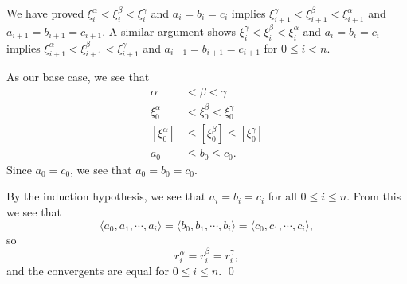\documentclass[12 pt]{amsart}
\begin{document}
  We  have proved 
  $\xi^{\alpha}_i < \xi^{\beta}_i < \xi^{\gamma}_i$
  and $a_i = b_i = c_i$ implies
  $\xi^{\gamma}_{i+1} < \xi^{\beta}_{i+1} < \xi^{\alpha}_{i+1}$
  and $a_{i+1} = b_{i+1} =  c_{i+1}$.
  A similar argument shows 
  $\xi^{\gamma}_i < \xi^{\beta}_i < \xi^{\alpha}_i$
  and $a_i = b_i = c_i$ implies
  $\xi^{\alpha}_{i+1} < \xi^{\beta}_{i+1} < \xi^{\gamma}_{i+1}$
  and $a_{i+1} = b_{i+1} =  c_{i+1}$
  for $0 \leq i < n$.

  As our base case, we see that 
  \begin{align*}
    \alpha &< \beta < \gamma \\
    \xi_0^{\alpha} &< \xi_0^{\beta} < \xi_0^{\gamma} \\
    [\xi_0^{\alpha}] &\leq [\xi_0^{\beta}] \leq [\xi_0^{\gamma}] \\
    a_0 &\leq b_0 \leq c_0.
  \end{align*}
  Since $a_0 = c_0$, we see that $a_0 = b_0 = c_0$.

  By the induction hypothesis, we see that 
  $a_i = b_i = c_i$ for all $0 \leq i \leq n$.
  From this we see that
  \[
    \langle a_0, a_1, \cdots, a_i \rangle
    = 
    \langle b_0, b_1, \cdots, b_i \rangle
    = 
    \langle c_0, c_1, \cdots, c_i \rangle,
  \]
  so 
  \[
    r_i^{\alpha} = r_i^{\beta} = r_i^{\gamma},
  \]
  and the convergents are equal for $0 \leq i \leq n$.
  \qed
\vfill
\newpage
\end{document}
